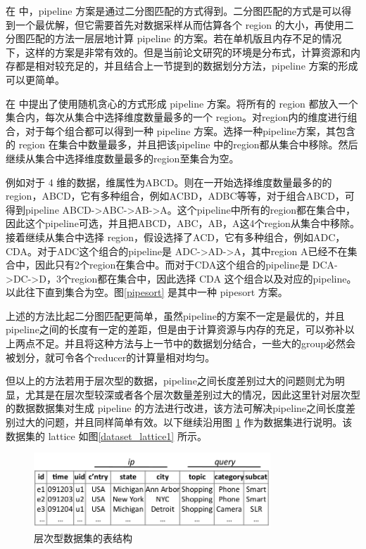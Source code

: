 在 \cite{agarwal1996computation} 中，pipeline 方案是通过二分图匹配的方式得到。二分图匹配的方式是可以得到一个最优解，但它需要首先对数据采样从而估算各个 region 的大小，再使用二分图匹配的方法一层层地计算 pipeline 的方案。若在单机版且内存不足的情况下，这样的方案是非常有效的。但是当前论文研究的环境是分布式，计算资源和内存都是相对较充足的，并且结合上一节提到的数据划分方法，pipeline 方案的形成可以更简单。

在\cite{wang2013scalable} 中提出了使用随机贪心的方式形成 pipeline 方案。将所有的 region 都放入一个集合内，每次从集合中选择维度数量最多的一个 region。对region内的维度进行组合，对于每个组合都可以得到一种 pipeline 方案。选择一种pipeline方案，其包含的 region 在集合中数量最多，并且把该pipeline 中的region都从集合中移除。然后继续从集合中选择维度数量最多的region至集合为空。

例如对于 4 维的数据，维属性为ABCD。则在一开始选择维度数量最多的的 region，ABCD，它有多种组合，例如ACBD，ADBC等等，对于组合ABCD，可得到pipeline ABCD-\textgreater ABC-\textgreater AB-\textgreater A。这个pipeline中所有的region都在集合中，因此这个pipeline可选，并且把ABCD，ABC，AB，A这4个region从集合中移除。接着继续从集合中选择 region，假设选择了ACD，它有多种组合，例如ADC，CDA。对于ADC这个组合的pipeline是  ADC-\textgreater AD-\textgreater A，其中region A已经不在集合中，因此只有2个region在集合中。而对于CDA这个组合的pipeline是  DCA-\textgreater DC-\textgreater D，3个region都在集合中，因此选择 CDA 这个组合以及对应的pipeline。以此往下直到集合为空。图\ref{pipesort} 是其中一种 pipesort 方案。

上述的方法比起二分图匹配更简单，虽然pipeline的方案不一定是最优的，并且pipeline之间的长度有一定的差距，但是由于计算资源与内存的充足，可以弥补以上两点不足。并且将这种方法与上一节中的数据划分结合，一些大的group必然会被划分，就可令各个reducer的计算量相对均匀。

但以上的方法若用于层次型的数据，pipeline之间长度差别过大的问题则尤为明显，尤其是在层次型较深或者各个层次数量差别过大的情况，因此这里针对层次型的数据数据集对生成 pipeline 的方法进行改进，该方法可解决pipeline之间长度差别过大的问题，并且同样简单有效。以下继续沿用图 \ref{dataset_table1} 作为数据集进行说明。该数据集的 lattice 如图\ref{dataset_lattice1} 所示。


\begin{figure}[!htb]
\centering\includegraphics[width=3.5in]{picture/ch_datacube_mr/dataset_table} 
\caption{层次型数据集的表结构}\label{dataset_table1} 
\end{figure} 

